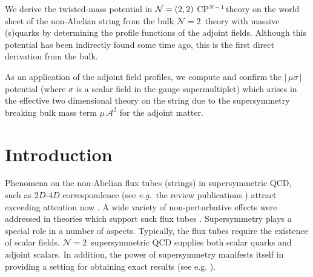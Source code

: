 \documentclass[12pt]{article}
\newcommand{\ntwo}{${\mathcal N}=2$}
\newcommand{\ntwon}{${\mathcal N}=2$}
\newcommand{\ca}{{\mathcal A}}
\newcommand{\cpn}{CP$^{N-1}$\,}
\newcommand{\eg}{{\it e.g.}~}
\begin{document}
\begin{titlepage}
	We derive  the twisted-mass potential in $ {\cal N}=(2,2) $ \cpn theory 
	on the world sheet of the non-Abelian string from the bulk \ntwo\, theory with massive (s)quarks
	by determining the profile functions of the adjoint fields.
	Although this potential has been indirectly found some time ago, this is the first  
	direct derivation from the bulk.

	As an application of the adjoint field profiles, we compute and confirm the $ |\, \mu \sigma \,| $ potential 
	(where $\sigma$ is a scalar field in the gauge supermultiplet)
	which arises in the effective two dimensional theory on the string 
	due to the supersymmetry breaking bulk mass term $ \mu\, \ca^2 $ for the adjoint matter.

\vspace{2cm}


\end{titlepage}




\section{Introduction}
\setcounter{equation}{0}

	Phenomena on the non-Abelian flux tubes (strings)  in supersymmetric QCD, such as $2D$-$4D$ 
	correspondence (see \eg the review publications
	\cite{Trev,SYrev})
	attract exceeding attention now \cite{GGS}.
	A wide variety of non-perturbative effects were addressed in theories 
	which support such flux tubes
	\cite{Shifman:2010id}.
	Supersymmetry plays a special role in a number of aspects.
	Typically, the flux tubes require the existence of scalar fields. 
	\ntwon\, supersymmetric QCD supplies both scalar quarks and adjoint scalars. In addition,
	the power of supersymmetry manifests itself in providing a setting for obtaining
	 exact results (see e.g.
	\cite{Novikov:1983uc,Seiberg:1994rs,Seiberg:1994aj,Shifman:2013ewa}).
\end{document}
